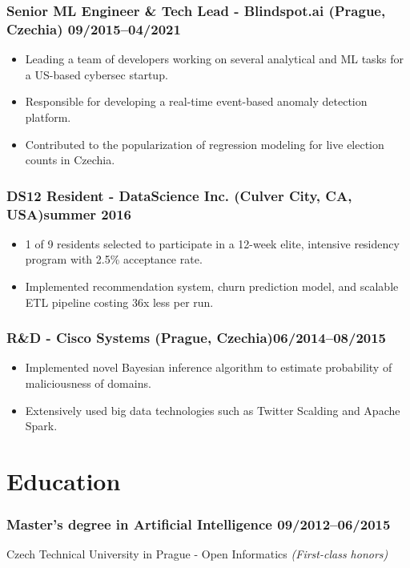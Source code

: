 \documentclass[10pt]{article}
\begin{document}
\subsubsection*{\bf Senior ML Engineer \& Tech Lead - Blindspot.ai (Prague, Czechia) \hfill 09/2015--04/2021}
	 \begin{itemize}
		\setlength\itemsep{-0.25em}
		\item Leading a team of developers working on several analytical and ML tasks for a US-based cybersec startup.
		\item Responsible for developing a real-time event-based anomaly detection platform.
		\item Contributed to the popularization of regression modeling for live election counts in Czechia.
	 \end{itemize}

\subsubsection*{\bf DS12 Resident - DataScience Inc. (Culver City, CA, USA)\hfill summer 2016}
	 \begin{itemize}
		\setlength\itemsep{-0.25em}
		\item 1 of 9 residents selected to participate in a 12-week elite, intensive residency program with 2.5\% acceptance rate.
        \item Implemented recommendation system, churn prediction model, and scalable ETL pipeline costing 36x less per run.
	 \end{itemize}

\subsubsection*{R\&D - Cisco Systems (Prague, Czechia)\hfill 06/2014--08/2015}
	 \begin{itemize}
		\setlength\itemsep{-0.25em}
		\item Implemented novel Bayesian inference algorithm to estimate probability of maliciousness of domains.
		\item Extensively used big data technologies such as Twitter Scalding and Apache Spark.
	 \end{itemize}

\section*{Education}
\subsubsection*{\bf Master’s degree in Artificial Intelligence \hfill 09/2012--06/2015}
\vspace{-1.5mm}
Czech Technical University in Prague - Open Informatics \textit{(First-class honors)}
\end{document}
